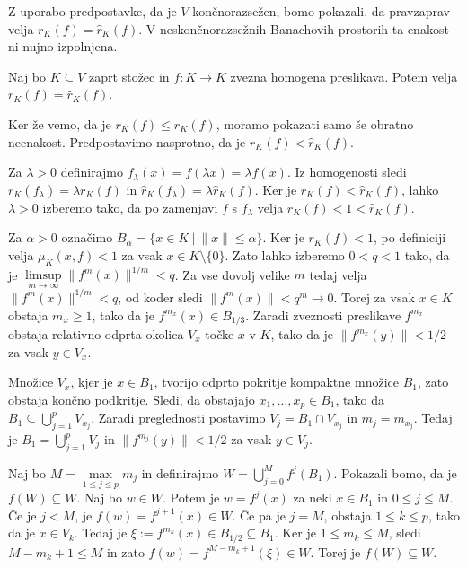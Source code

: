 \documentclass[mat2, tisk]{fmfdelo}
\begin{document}
Z uporabo predpostavke, da je $V$ končnorazsežen, bomo pokazali, da
pravzaprav velja $r_K(f)=\widehat r_K(f)$. V neskončnorazsežnih
Banachovih prostorih ta enakost ni nujno izpolnjena.

\begin{izrek}\label{izr:enakost_stozcnih_spektralnih_radijev}
  Naj bo $K\subseteq V$ zaprt stožec in
  $f\colon K\longrightarrow K$ zvezna homogena preslikava. Potem velja
  $r_K(f)=\widehat r_K(f)$.
\end{izrek}

\begin{dokaz}
  Ker že vemo, da je $r_K(f)\leq\widehat r_K(f)$, moramo pokazati samo še
  obratno neenakost. Predpostavimo nasprotno, da je
  $r_K(f)<\widehat r_K(f)$.

  Za $\lambda>0$ definirajmo $f_\lambda(x)=f(\lambda x)=\lambda f(x)$.
  Iz homogenosti sledi
  $r_K(f_\lambda)=\lambda r_K(f)$ in
  $\widehat r_K(f_\lambda)=\lambda\widehat r_K(f)$.
  Ker je $r_K(f)<\widehat r_K(f)$, lahko $\lambda>0$ izberemo tako, da po
  zamenjavi $f$ s $f_\lambda$ velja
  $r_K(f)<1<\widehat r_K(f)$.

  Za $\alpha>0$ označimo
  $B_\alpha=\{x\in K ~|~ \|x\|\leq\alpha\}$.
  Ker je $r_K(f)<1$, po definiciji velja $\mu_K(x,f)<1$
  za vsak $x\in K\setminus\{0\}$. Zato lahko izberemo
  $0<q<1$ tako, da je
  $\limsup\limits_{m\to\infty}\|f^m(x)\|^{1/m}<q$.
  Za vse dovolj velike $m$ tedaj velja
  $\|f^m(x)\|^{1/m}<q$, od koder sledi
  $\|f^m(x)\|<q^m\to0$.
  Torej za vsak $x\in K$ obstaja $m_x\geq1$, tako da je
  $f^{m_x}(x)\in B_{1/3}$. Zaradi zveznosti preslikave $f^{m_x}$ obstaja
  relativno odprta okolica $V_x$ točke $x$ v $K$, tako da je
  $\|f^{m_x}(y)\|<1/2$ za vsak $y\in V_x$.

  Množice $V_x$, kjer je $x\in B_1$, tvorijo odprto pokritje kompaktne
  množice $B_1$, zato obstaja končno podkritje. Sledi, da obstajajo $x_1,\ldots,x_p\in B_1$, tako da
  $B_1\subseteq\bigcup\limits_{j=1}^p V_{x_j}$. Zaradi preglednosti postavimo
  $V_j=B_1\cap V_{x_j}$ in $m_j=m_{x_j}$. Tedaj je
  $B_1=\bigcup\limits_{j=1}^p V_j$ in $\|f^{m_j}(y)\|<1/2$ za vsak $y\in V_j$.

  Naj bo $M=\max\limits_{1\leq j\leq p}m_j$ in definirajmo
  $W=\bigcup\limits_{j=0}^{M}f^j(B_1)$. Pokazali bomo, da je $f(W)\subseteq W$.
  Naj bo $w\in W$. Potem je $w=f^j(x)$ za neki $x\in B_1$ in
  $0\leq j\leq M$. Če je $j<M$, je
  $f(w)=f^{j+1}(x)\in W$.
  Če pa je $j=M$, obstaja $1\leq k\leq p$, tako da je $x\in V_k$.
  Tedaj je $\xi:=f^{m_k}(x)\in B_{1/2}\subseteq B_1$. Ker je
  $1\leq m_k\leq M$, sledi $M-m_k+1\leq M$ in zato
  $f(w)=f^{M-m_k+1}(\xi)\in W$. Torej je $f(W)\subseteq W$.


\end{dokaz}
\end{document}

